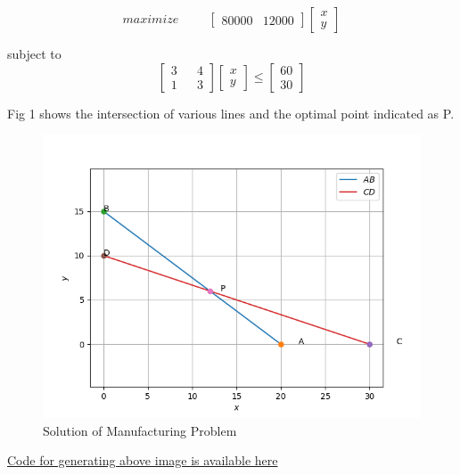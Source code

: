 \documentclass[journal,12pt,onecolumn]{IEEEtran}
\begin{document}
\begin{enumerate}
\begin{equation}
maximize\hspace{1cm}
\begin{bmatrix}
80000&12000
\end{bmatrix}
\begin{bmatrix}
x\\y
\end{bmatrix}
\end{equation}

subject to
\begin{equation}
\begin{bmatrix}
3&&4\\1&&3
\end{bmatrix}
\begin{bmatrix}
x\\y
\end{bmatrix}
\leq
\begin{bmatrix}
60\\30
\end{bmatrix}
\end{equation}


Fig 1 shows the intersection of various lines and the optimal point indicated as P.
\begin{figure}[h]
\includegraphics[width=0.9\columnwidth]{Manufacturing.png}
\caption{Solution of Manufacturing Problem}
\end{figure}


\href{https://github.com/vivek13s08/Optimization/blob/master/Manufacturing.py}{Code for generating above image is available here}

\end{enumerate}
\end{document}
